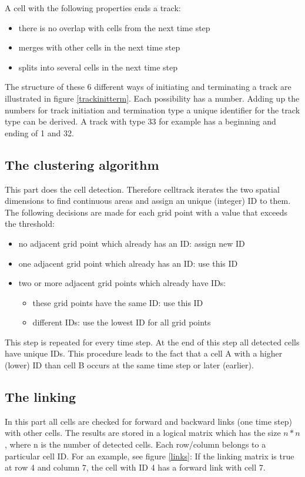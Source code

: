 \documentclass{scrartcl}
\begin{document}
 A cell with the following properties ends a track:
\begin{itemize}
	\item there is no overlap with cells from the next time step
	\item merges with other cells in the next time step
	\item splits into several cells in the next time step
\end{itemize}
The structure of these 6 different ways of initiating and terminating a track are illustrated in figure \ref{trackinitterm}. Each possibility has a number. Adding up the numbers for track initiation and termination type a unique identifier for the track type can be derived. A track with type 33 for example has a beginning and ending of 1 and 32. 

\subsection{The clustering algorithm}
This part does the cell detection. Therefore celltrack iterates the two spatial dimensions to find continuous areas and assign an unique (integer) ID to them. The following decisions are made for each grid point with a value that exceeds the threshold:
\begin{itemize}
	\item no adjacent grid point which already has an ID: assign new ID
	\item one adjacent grid point which already has an ID: use this ID
	\item two or more adjacent grid points which already have  IDs:
	\begin{itemize}
		\item these grid points have the same ID: use this ID
		\item different IDs: use the lowest ID for all grid points
	\end{itemize}
\end{itemize}
This step is repeated for every time step. At the end of this step all detected cells have unique IDs. This procedure leads to the fact that a cell A with a higher (lower) ID than cell B occurs at the same time step or later (earlier).

\subsection{The linking}
In this part all cells are checked for forward and backward links (one time step) with other cells. The results are stored in a logical matrix which has the size $n * n$, where n is the number of detected cells. Each row/column belongs to a particular cell ID. For an example, see figure \ref{links}: If the linking matrix is true at row 4 and column 7, the cell with ID 4 has a forward link with cell 7.
\end{document}

